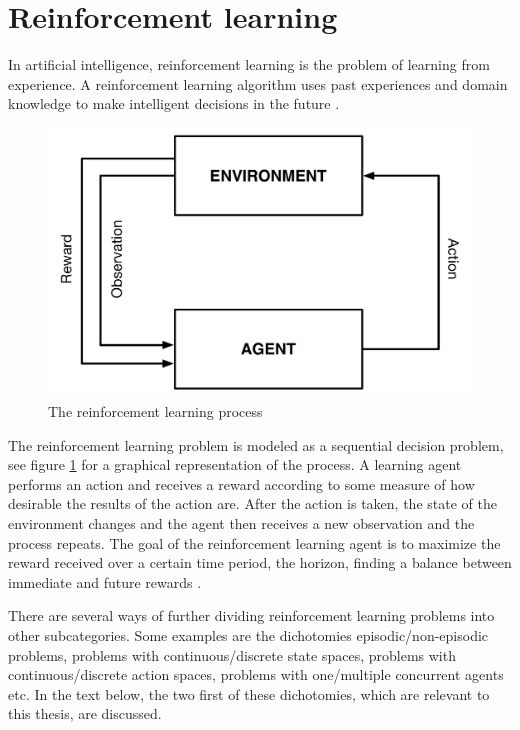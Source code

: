 \section{Reinforcement learning}

In artificial intelligence, reinforcement learning is the problem of learning from experience. A reinforcement learning algorithm uses past experiences and domain knowledge to make intelligent decisions in the future \parencite{barto1998reinforcement}.

\begin{figure}[htbp]
\includegraphics[width=\textwidth]{images/agent-environment.pdf}
\caption{The reinforcement learning process}
\label{fig:agentandenvironment}
\end{figure}

The reinforcement learning problem is modeled as a sequential decision problem, see figure \ref{fig:agentandenvironment} for a graphical representation of the process. A learning agent performs an action and receives a reward according to some measure of how desirable the results of the action are.  After the action is taken, the state of the environment changes and the agent then receives a new observation and the process repeats. The goal of the reinforcement learning agent is to maximize the reward received over a certain time period, the horizon, finding a balance between immediate and future rewards \parencite{barto1998reinforcement}. 

There are several ways of further dividing reinforcement learning problems into other subcategories. Some examples are the dichotomies episodic/non-episodic problems, problems with continuous/discrete state spaces, problems with continuous/discrete action spaces, problems with one/multiple concurrent agents etc. In the text below, the two first of these dichotomies, which are relevant to this thesis, are discussed. 

